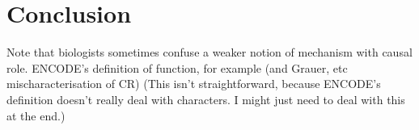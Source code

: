 \documentclass{article}
\begin{document}




\section{Conclusion}
\label{sec:conclusion}

Note that biologists sometimes confuse a weaker notion of mechanism with causal role.
ENCODE's definition of function, for example (and Grauer, etc mischaracterisation of CR)
(This isn't straightforward, because ENCODE's definition doesn't really deal with characters. I might just need to deal with this at the end.)
\end{document}

